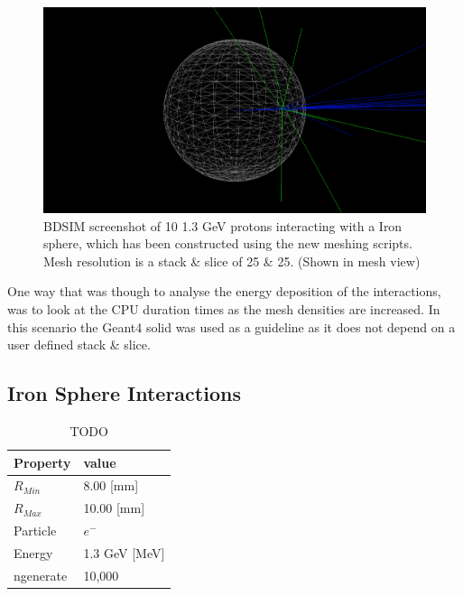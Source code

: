 \documentclass[12pt,a4paper]{article}
\begin{document}
\begin{figure}[h!]
\centering
\includegraphics[scale=0.35]{Images//BDSIM//ProtonSphere2.png}
\caption[width=\columnwidth]{BDSIM screenshot of 10 1.3 GeV protons interacting with a Iron sphere, which has been constructed using the new meshing scripts. Mesh resolution is a stack \& slice of 25 \& 25. (Shown in mesh view)}
\label{sphbd}
\end{figure}


\noindent One way that was though to analyse the energy deposition of the interactions, was to look at the CPU duration times as the mesh densities are increased. In this scenario the Geant4 solid was used as a guideline as it does not depend on a user defined stack \& slice. 


\subsection{Iron Sphere Interactions}

\begin{table}[h!]
\centering
\begin{tabular}{|l|l|}
\hline
Property & value \\ \hline
$R_{Min}$ &  8.00 [mm]\\ \hline
$R_{Max}$ &  10.00 [mm]\\ \hline
Particle &  $e^-$\\ \hline
Energy & 1.3 GeV [MeV]\\ \hline
ngenerate & 10,000\\ \hline
\end{tabular}
\caption{TODO}
\label{rs}
\end{table}
\end{document}
